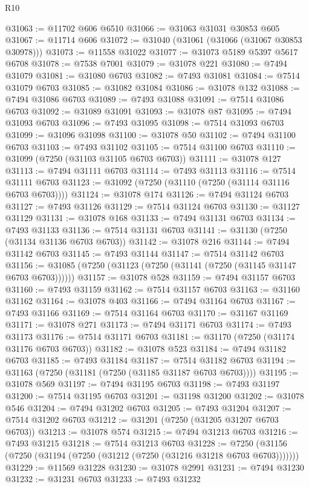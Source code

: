 \begin{lexlean}{R10}
\begin{coremodule}
@31063 := @11702 @606 @6510
@31066 := @31063 @31031 @30853 @605
@31067 := @11714 @606
@31072 := @31040 (@31061 (@31066 (@31067 @30853 @30978)))
@31073 := @11558 @31022
@31077 := @31073 @5189 @5397 @5617 @6708
@31078 := @7538 @7001
@31079 := @31078 @221
@31080 := @7494 @31079
@31081 := @31080 @6703
@31082 := @7493 @31081
@31084 := @7514 @31079 @6703
@31085 := @31082 @31084
@31086 := @31078 @132
@31088 := @7494 @31086 @6703
@31089 := @7493 @31088
@31091 := @7514 @31086 @6703
@31092 := @31089 @31091
@31093 := @31078 @87
@31095 := @7494 @31093 @6703
@31096 := @7493 @31095
@31098 := @7514 @31093 @6703
@31099 := @31096 @31098
@31100 := @31078 @50
@31102 := @7494 @31100 @6703
@31103 := @7493 @31102
@31105 := @7514 @31100 @6703
@31110 := @31099 (@7250 (@31103 @31105 @6703 @6703))
@31111 := @31078 @127
@31113 := @7494 @31111 @6703
@31114 := @7493 @31113
@31116 := @7514 @31111 @6703
@31123 := @31092 (@7250 (@31110 (@7250 (@31114 @31116 @6703 @6703))))
@31124 := @31078 @174
@31126 := @7494 @31124 @6703
@31127 := @7493 @31126
@31129 := @7514 @31124 @6703
@31130 := @31127 @31129
@31131 := @31078 @168
@31133 := @7494 @31131 @6703
@31134 := @7493 @31133
@31136 := @7514 @31131 @6703
@31141 := @31130 (@7250 (@31134 @31136 @6703 @6703))
@31142 := @31078 @216
@31144 := @7494 @31142 @6703
@31145 := @7493 @31144
@31147 := @7514 @31142 @6703
@31156 := @31085 (@7250 (@31123 (@7250 (@31141 (@7250 (@31145 @31147 @6703 @6703))))))
@31157 := @31078 @528
@31159 := @7494 @31157 @6703
@31160 := @7493 @31159
@31162 := @7514 @31157 @6703
@31163 := @31160 @31162
@31164 := @31078 @403
@31166 := @7494 @31164 @6703
@31167 := @7493 @31166
@31169 := @7514 @31164 @6703
@31170 := @31167 @31169
@31171 := @31078 @271
@31173 := @7494 @31171 @6703
@31174 := @7493 @31173
@31176 := @7514 @31171 @6703
@31181 := @31170 (@7250 (@31174 @31176 @6703 @6703))
@31182 := @31078 @523
@31184 := @7494 @31182 @6703
@31185 := @7493 @31184
@31187 := @7514 @31182 @6703
@31194 := @31163 (@7250 (@31181 (@7250 (@31185 @31187 @6703 @6703))))
@31195 := @31078 @569
@31197 := @7494 @31195 @6703
@31198 := @7493 @31197
@31200 := @7514 @31195 @6703
@31201 := @31198 @31200
@31202 := @31078 @546
@31204 := @7494 @31202 @6703
@31205 := @7493 @31204
@31207 := @7514 @31202 @6703
@31212 := @31201 (@7250 (@31205 @31207 @6703 @6703))
@31213 := @31078 @574
@31215 := @7494 @31213 @6703
@31216 := @7493 @31215
@31218 := @7514 @31213 @6703
@31228 := @7250 (@31156 (@7250 (@31194 (@7250 (@31212 (@7250 (@31216 @31218 @6703 @6703)))))))
@31229 := @11569 @31228
@31230 := @31078 @2991
@31231 := @7494 @31230
@31232 := @31231 @6703
@31233 := @7493 @31232

\end{coremodule}
\end{lexlean}
